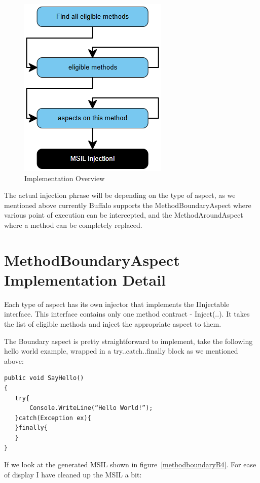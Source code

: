\begin{figure}[H]
  \includegraphics[scale=1.0]{ImplementationOverview3.PNG}
  \centering
  \caption{Implementation Overview\label{implementation_overview}}
\end{figure}

The actual injection phrase will be depending on the type of aspect, as we mentioned above currently Buffalo supports the MethodBoundaryAspect where various point of execution can be intercepted, and the MethodAroundAspect where a method can be completely replaced.

\section{MethodBoundaryAspect Implementation Detail}

Each type of aspect has its own injector that implements the IInjectable interface. This interface contains only one method contract - Inject(..). It takes the list of eligible methods and inject the appropriate aspect to them.

The Boundary aspect is pretty straightforward to implement, take the following hello world example, wrapped in a try..catch..finally block as we mentioned above:

\begin{lstlisting}[caption={SayHello function}, label=sayhello]
public void SayHello()
{
   try{
       Console.WriteLine(“Hello World!”);
   }catch(Exception ex){
   }finally{
   }
}
\end{lstlisting}

If we look at the generated MSIL shown in figure~\ref{methodboundaryB4}. For ease of display I have cleaned up the MSIL a bit:

